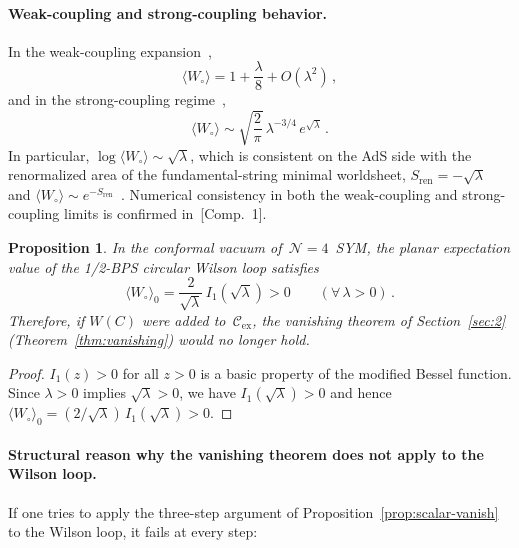 \documentclass[
  aps,
  prd,
  preprint,
  groupedaddress,
  nofootinbib,
  longbibliography
]{revtex4-2}
\newtheorem{proposition}[definition]{Proposition}
\theoremstyle{remark}
\newcommand{\Cex}{\mathcal{C}_{\mathrm{ex}}}
\newcommand{\N}{\mathcal{N}}
\begin{document}
\paragraph{Weak-coupling and strong-coupling behavior.}
In the weak-coupling
expansion~\cite{ref29,ref30},
\begin{equation}\label{eq:Wilson-weak}
  \langle W_\circ\rangle
  = 1 + \frac{\lambda}{8} + O(\lambda^2)\,,
\end{equation}
and in the strong-coupling
regime~\cite{ref29,ref30},
\begin{equation}\label{eq:Wilson-strong}
  \langle W_\circ\rangle
  \sim \sqrt{\frac{2}{\pi}}\,\lambda^{-3/4}\,
  e^{\sqrt{\lambda}}\,.
\end{equation}
In particular,
$\log\langle W_\circ\rangle \sim \sqrt{\lambda}$,
which is consistent on the AdS side with
the renormalized area of the fundamental-string minimal
worldsheet,
$S_{\mathrm{ren}}=-\sqrt{\lambda}$ and
$\langle W_\circ\rangle\sim
e^{-S_{\mathrm{ren}}}$~\cite{ref28}.
Numerical consistency in both the weak-coupling and
strong-coupling limits is confirmed in~[Comp.~1].

\begin{proposition}\label{prop:Wilson-nonzero}
In the conformal vacuum of~$\N=4$~SYM, the planar expectation
value of the 1/2-BPS circular Wilson loop satisfies
\begin{equation}\label{eq:Wilson-pos}
  \langle W_\circ\rangle_0
  = \frac{2}{\sqrt{\lambda}}\,I_1(\sqrt{\lambda})>0
  \qquad(\forall\,\lambda>0)\,.
\end{equation}
Therefore, if $W(C)$ were added to~$\Cex$, the vanishing theorem
of Section~\ref{sec:2}
(Theorem~\ref{thm:vanishing}) would no longer hold.
\end{proposition}

\begin{proof}
$I_1(z)>0$ for all $z>0$ is a basic property of the modified
Bessel function.
Since $\lambda>0$ implies $\sqrt{\lambda}>0$, we have
$I_1(\sqrt{\lambda})>0$ and hence
$\langle W_\circ\rangle_0
=(2/\sqrt{\lambda})\,I_1(\sqrt{\lambda})>0$.
\end{proof}

\paragraph{Structural reason why the vanishing theorem does not
  apply to the Wilson loop.}
If one tries to apply the three-step argument of
Proposition~\ref{prop:scalar-vanish} to the Wilson loop, it fails
at every step:
\end{document}
